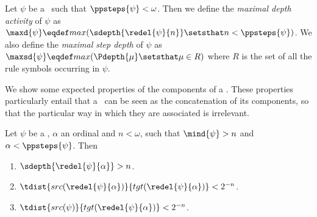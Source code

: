 \begin{definition}
\label{dfn:maxd}
Let $\psi$ be a \ppterm\ such that $\ppsteps{\psi} < \omega$.
Then we define the \emph{maximal depth activity} of $\psi$ as $\maxd{\psi} \eqdef max(\sdepth{\redel{\psi}{n}} \setsthat n < \ppsteps{\psi})$.
We also define the \emph{maximal step depth} of $\psi$ as $\maxsd{\psi} \eqdef max(\Pdepth{\mu} \setsthat \mu \in R)$ where $R$ is the set of all the rule symbols occurring in $\psi$.
\end{definition}


\medskip
We show some expected properties of the components of a \ppterm.
These properties particularly entail that a \ppterm\ can be seen as the concatenation of its components, so that the particular way in which they are associated is irrelevant. 

\begin{lemma}
\label{rsl:ppterm-mind-big-then-tdist-little}
Let $\psi$ be a \ppterm, $\alpha$ an ordinal and $n < \omega$, such that $\mind{\psi} > n$ and $\alpha < \ppsteps{\psi}$. Then 
\begin{enumerate}
	\item \label{it:ppterm-mind-big-then-step-mind-big}
	$\sdepth{\redel{\psi}{\alpha}} > n$.
	\item \label{it:ppterm-mind-big-then-tdist-little-step}
	$\tdist{src(\redel{\psi}{\alpha})}{tgt(\redel{\psi}{\alpha})} < 2^{-n}$.
	\item \label{it:ppterm-mind-big-then-tdist-little-src}
	$\tdist{src(\psi)}{tgt(\redel{\psi}{\alpha})} < 2^{-n}$.
\end{enumerate}
\end{lemma}

